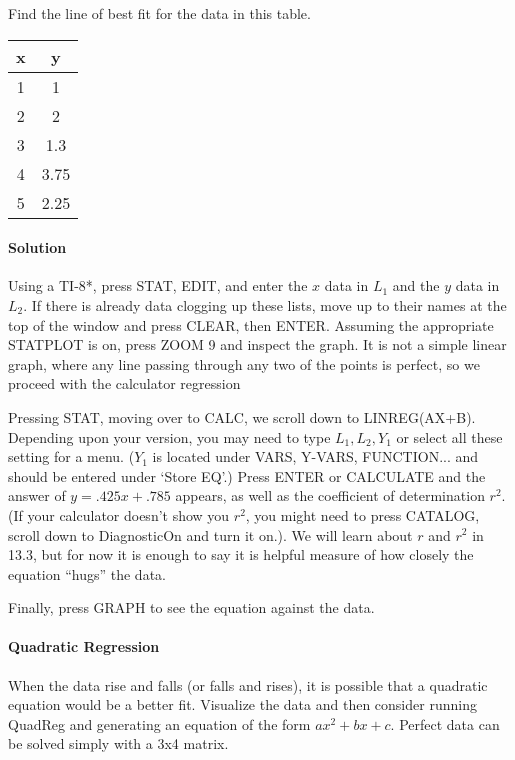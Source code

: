 \begin{example}
Find the line of best fit for the data in this table.

\begin{tabular}{c|c}
   \textbf{x} & \textbf{y} \\ \hline 
   1 & 1 \\
   2 & 2 \\
   3 & 1.3 \\
   4 & 3.75 \\
   5 & 2.25 \\
\end{tabular}

\paragraph{Solution}
Using a TI-8*, press STAT, EDIT, and enter the $x$ data in $L_1$ and the $y$ data in $L_2$.  If
there is already data clogging up these lists, move up to their names at the top of the window
and press CLEAR, then ENTER.  Assuming
the appropriate STATPLOT is on, press ZOOM 9 and inspect the graph.  It is not a simple linear graph, where
any line passing through any two of the points is perfect, so we proceed with the calculator regression

Pressing STAT, moving over to CALC, we scroll down to LINREG(AX+B).  Depending upon your version,
you may need to type $L_1, L_2, Y_1$ or select all these setting for a menu.  ($Y_1$ is located under
VARS, Y-VARS, FUNCTION... and should be entered under `Store EQ'.) Press ENTER or CALCULATE 
and the answer of $y=.425x+.785$ appears, as well as the coefficient of determination $r^2$.  (If your
calculator doesn't show you $r^2$, you might need to press CATALOG, scroll down to DiagnosticOn
and turn it on.). We will learn about $r$ and $r^2$ in 13.3, but for now it is enough to say it is helpful
measure of how closely the equation ``hugs'' the data.

Finally, press GRAPH to see the equation against the data.
\end{example}

\paragraph{Quadratic Regression}
When the data rise and falls (or falls and rises), it is possible that a quadratic equation would be a better fit.
Visualize the data and then consider running QuadReg and generating an equation of the form $ax^2+bx+c$.
Perfect data can be solved simply with a 3x4 matrix.

